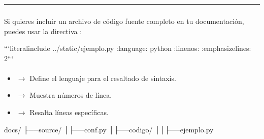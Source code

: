 \documentclass[a4paper,10pt,spanish]{sphinxmanual}
\begin{document}
\bigskip\hrule\bigskip



\subsubsection{}
\label{\detokenize{configuracion_inicial/013.guia_de_myst_parser:mostrar-archivos-de-codigo-completo}}
\sphinxAtStartPar
Si quieres incluir un archivo de código fuente completo en tu documentación, puedes usar la directiva :

\begin{sphinxVerbatim}[commandchars=\\\{\}]
```\PYGZob{}literalinclude\PYGZcb{} ../\PYGZus{}static/ejemplo.py
:language: python
:linenos:
:emphasize\PYGZhy{}lines: 2```
\end{sphinxVerbatim}


\paragraph{}
\label{\detokenize{configuracion_inicial/013.guia_de_myst_parser:parametros}}\begin{itemize}
\item {} 
\sphinxAtStartPar
{} \(\rightarrow\) Define el lenguaje para el resaltado de sintaxis.

\item {} 
\sphinxAtStartPar
{} \(\rightarrow\) Muestra números de línea.

\item {} 
\sphinxAtStartPar
{} \(\rightarrow\) Resalta líneas específicas.

\end{itemize}

\sphinxAtStartPar
{}

\begin{sphinxVerbatim}[commandchars=\\\{\}]
docs/
├──source/
│├──conf.py
│├──codigo/
││├──ejemplo.py
\end{sphinxVerbatim}

\sphinxAtStartPar
{}
\end{document}
